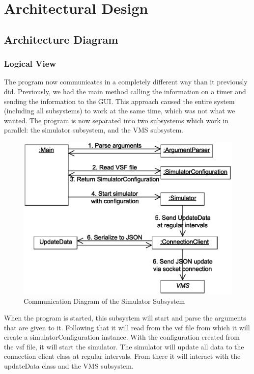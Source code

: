 \documentclass{article}
\begin{document}
\section{Architectural Design} %

\subsection{Architecture Diagram} %

\subsubsection{Logical View} %

The program now communicates in a completely different way than it previously did. Previously, we had the main method calling the information on a timer and sending the information to the GUI. This approach caused the entire system (including all subsystems) to work at the same time, which was not what we wanted. The program is now separated into two subsystems which work in parallel: the simulator subsystem, and the VMS subsystem.

\begin{figure}[!htb]
\caption{Communication Diagram of the Simulator Subsystem}
\centering
\includegraphics[scale=0.5]{diagrams/simulator-communication-diagram.eps}
\end{figure}

When the program is started, this subsystem will start and parse the arguments that are given to it. Following that it will read from the vsf file from which it will create a simulatorConfiguration instance. With the configuration created from the vsf file, it will start the simulator.  The simulator will update all data to the connection client class at regular intervals. From there it will interact with the updateData class and the VMS subsystem.
\end{document}
